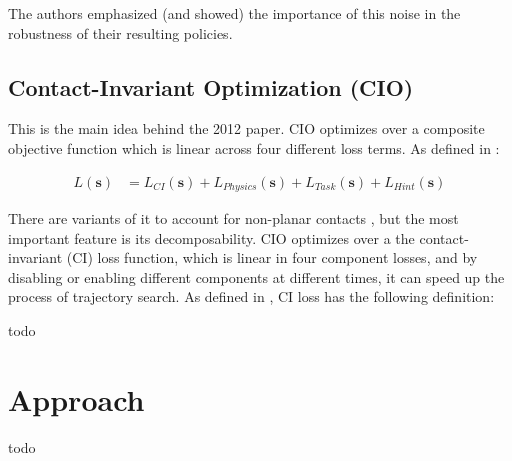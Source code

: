 \documentclass{article}
\newcommand{\bvec}[1]{\boldsymbol{#1}}
\begin{document}
The authors emphasized (and showed) the importance of this noise in the robustness of their resulting policies.

\subsection{Contact-Invariant Optimization (CIO)}
This is the main idea behind the 2012 paper. CIO optimizes over a composite objective function which is linear across four different loss terms. As defined in \cite{mordatch2012contact}:

\begin{align*}
L(\bvec{s}) &= L_{CI}(\bvec{s}) + L_{Physics}(\bvec{s}) + L_{Task}(\bvec{s}) + L_{Hint}(\bvec{s})
\end{align*}

There are variants of it to account for non-planar contacts \cite{mordatch2012contact}, but the most important feature is its decomposability. CIO optimizes over a the contact-invariant (CI) loss function, which is linear in four component losses, and by disabling or enabling different components at different times, it can speed up the process of trajectory search. As defined in \cite{mordatch2012contact}, CI loss has the following definition:

todo

\section{Approach}

todo






\end{document}
